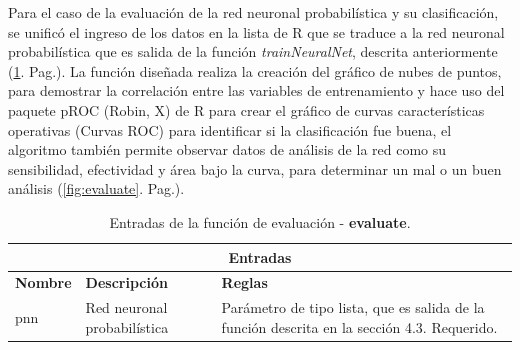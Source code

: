 	Para el caso de la evaluación de la red neuronal probabilística y su clasificación, se unificó el ingreso de los datos en la lista de R que se traduce a la red neuronal probabilística que es salida de la función \textit{trainNeuralNet}, descrita anteriormente (\ref{tabla:entradasEvaluate}. Pag.\pageref{tabla:entradasEvaluate}). La función diseñada realiza la creación del gráfico de nubes de puntos, para demostrar la correlación entre las variables de entrenamiento y hace uso del paquete pROC (Robin, X) de R para crear el gráfico de curvas características operativas (Curvas ROC) para identificar si la clasificación fue buena, el algoritmo también permite observar datos de análisis de la red como su sensibilidad, efectividad y área bajo la curva, para determinar un mal o un buen análisis (\ref{fig:evaluate}. Pag.\pageref{fig:evaluate}).\\

\begin{table}[htb]
\begin{center}
\begin{tabular}{|p{3cm}|p{5cm}|p{8cm}|}
\hline
\multicolumn{3}{|c|}{\textbf{Entradas}} \\
\hline
\textbf{Nombre} & \textbf{Descripción} & \textbf{Reglas} \\
\hline \hline
pnn & Red neuronal probabilística & Parámetro de tipo lista, que es salida de la función descrita en la sección 4.3. Requerido. \\ \hline
\end{tabular}
\caption{Entradas de la función de evaluación - \textbf{evaluate}.}
\label{tabla:entradasEvaluate}
\end{center}
\end{table}

